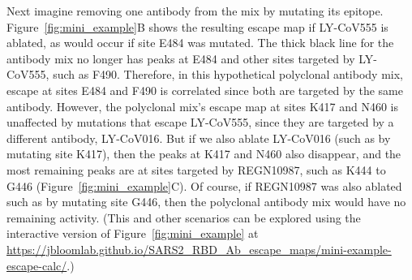 \documentclass[9pt,twocolumn,twoside]{gsajnl_modified}
\begin{document}
Next imagine removing one antibody from the mix by mutating its epitope.
Figure~\ref{fig:mini_example}B shows the resulting escape map if LY-CoV555 is ablated, as would occur if site E484 was mutated.
The thick black line for the antibody mix no longer has peaks at E484 and other sites targeted by LY-CoV555, such as F490.
Therefore, in this hypothetical polyclonal antibody mix, escape at sites E484 and F490 is correlated since both are targeted by the same antibody.
However, the polyclonal mix's escape map at sites K417 and N460 is unaffected by mutations that escape LY-CoV555, since they are targeted by a different antibody, LY-CoV016.
But if we also ablate LY-CoV016 (such as by mutating site K417), then the peaks at K417 and N460 also disappear, and the most remaining peaks are at sites targeted by REGN10987, such as K444 to G446 (Figure~\ref{fig:mini_example}C).
Of course, if REGN10987 was also ablated such as by mutating site G446, then the polyclonal antibody mix would have no remaining activity.
(This and other scenarios can be explored using the interactive version of Figure~\ref{fig:mini_example} at \url{https://jbloomlab.github.io/SARS2_RBD_Ab_escape_maps/mini-example-escape-calc/}.)
\end{document}
